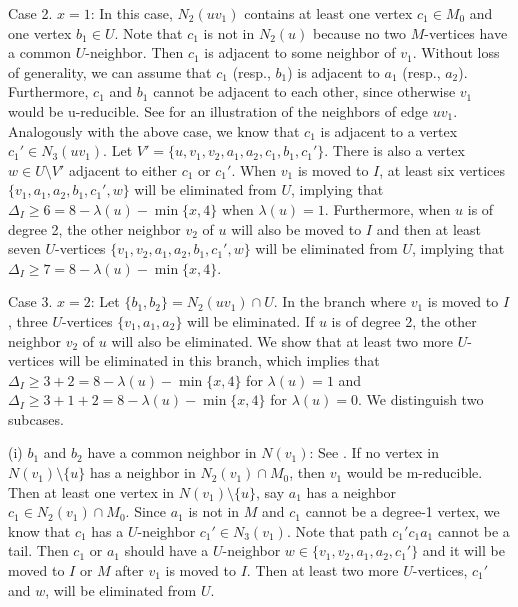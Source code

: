 \documentclass{elsart_TR2}
\begin{document}
\vspace{-0mm}\vspace{-0mm}

Case 2. $x=1$: In this case,  $N_2(uv_1)$ contains at least one vertex $c_1\in M_0$ and one vertex $b_1\in U$.
Note that $c_1$ is not in $N_2(u)$ because no two $M$-vertices have a common $U$-neighbor.
Then $c_1$ is adjacent to some neighbor of $v_1$. Without loss of generality, we can assume that
$c_1$ (resp.,   $b_1$)  is adjacent to $a_1$  (resp.,  $a_2$).
Furthermore, $c_1$ and $b_1$ cannot be adjacent to each other, since otherwise $v_1$ would be u-reducible.
See  for an illustration of  the neighbors of edge $uv_1$.
 Analogously with the above case, we know that $c_1$ is adjacent to a vertex $c_1'\in N_3(uv_1)$.
Let $V'=\{u,v_1,v_2,a_1,a_2,c_1,b_1,c_1'\}$.
There is also a vertex $w\in U\setminus V'$ adjacent to either $c_1$ or $c_1'$.
When $v_1$ is moved to $I$, at least six vertices $\{v_1,a_1,a_2,b_1,c_1',w\}$ will be eliminated from $U$,
implying that $\Delta_I\geq 6=8-\lambda(u)-\min\{x,4\}$ when $\lambda(u)=1$.
Furthermore, when $u$ is of degree 2, the other neighbor $v_2$ of $u$ will also be moved to $I$ and
then at least seven $U$-vertices $\{v_1,v_2,a_1,a_2,b_1,c_1',w\}$ will be eliminated from $U$,
 implying that $\Delta_I\geq 7=8-\lambda(u)-\min\{x,4\}$.



Case 3. $x=2$: Let $\{b_1,b_2\}=N_2(uv_1)\cap U$.
In the branch where $v_1$ is moved to $I$, three $U$-vertices $\{v_1, a_1, a_2\}$ will be eliminated. If $u$ is of degree 2, the other neighbor $v_2$ of $u$ will also be eliminated. We show that at least two more $U$-vertices will be eliminated in this branch,
which implies that $\Delta_I\geq 3+2=8-\lambda(u)-\min\{x,4\}$ for $\lambda(u)=1$ and
$\Delta_I\geq 3+1+2=8-\lambda(u)-\min\{x,4\}$ for $\lambda(u)=0$.
We distinguish  two subcases.

(i) $b_1$ and $b_2$ have a common neighbor in $N(v_1)$:
See .
If no vertex in $N(v_1)\setminus \{u\}$  has a neighbor in $N_2(v_1)\cap M_0$, then $v_1$ would be m-reducible.
Then at least one vertex in $N(v_1)\setminus \{u\}$, say $a_1$ has a neighbor $c_1\in N_2(v_1)\cap M_0$.
Since $a_1$ is not in $M$ and $c_1$ cannot be a degree-1 vertex, we know that $c_1$ has a $U$-neighbor $c_1'\in N_3(v_1)$.
Note that path $c_1'c_1a_1$ cannot be a tail. Then $c_1$ or $a_1$ should have a $U$-neighbor $w\in \{v_1,v_2,a_1,a_2,c_1'\}$ and it will be moved to $I$ or $M$ after $v_1$ is moved to $I$.
Then at least two more $U$-vertices, $c_1'$ and $w$, will be eliminated from $U$.
\end{document}
